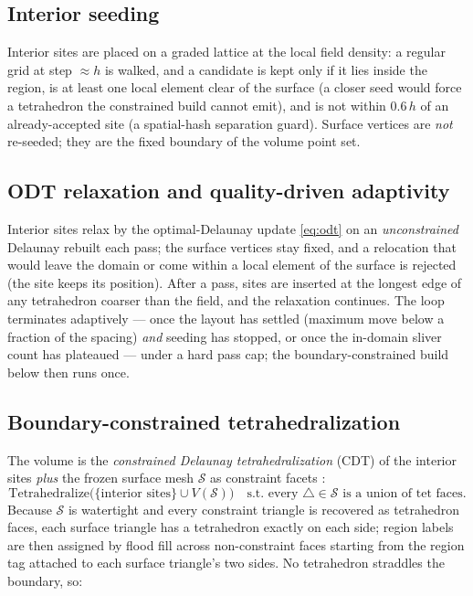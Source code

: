 \documentclass[11pt,a4paper]{article}
\numberwithin{equation}{section}
\begin{document}
\subsection{Interior seeding}
Interior sites are placed on a graded lattice at the local field density: a
regular grid at step $\approx h$ is walked, and a candidate is kept only if it
lies inside the region, is at least one local element clear of the surface (a
closer seed would force a tetrahedron the constrained build cannot emit), and is
not within $0.6\,h$ of an already-accepted site (a spatial-hash separation
guard). Surface vertices are \emph{not} re-seeded; they are the fixed boundary of
the volume point set.

\subsection{ODT relaxation and quality-driven adaptivity}
Interior sites relax by the optimal-Delaunay update \eqref{eq:odt} on an
\emph{unconstrained} Delaunay rebuilt each pass; the surface vertices stay fixed,
and a relocation that would leave the domain or come within a local element of the
surface is rejected (the site keeps its position). After a pass, sites are
inserted at the longest edge of any tetrahedron coarser than the field, and the
relaxation continues. The loop terminates adaptively --- once the layout has
settled (maximum move below a fraction of the spacing) \emph{and} seeding has
stopped, or once the in-domain sliver count has plateaued --- under a hard pass
cap; the boundary-constrained build below then runs once.

\subsection{Boundary-constrained tetrahedralization}
The volume is the \emph{constrained
Delaunay tetrahedralization} (CDT) of the interior sites \emph{plus} the frozen
surface mesh $\mathcal{S}$ as constraint facets
\cite{Si2015,ShewchukCDT2002,ChengDeyShewchuk2012}:
\begin{equation}
\text{Tetrahedralize}\bigl(\{\text{interior sites}\}\cup V(\mathcal{S})\bigr)
\quad\text{s.t. every } \triangle\in\mathcal{S} \text{ is a union of tet faces.}
\end{equation}
Because $\mathcal{S}$ is watertight and every constraint triangle is recovered
as tetrahedron faces, each surface triangle has a tetrahedron exactly on each
side; region labels are then assigned by flood fill across non-constraint faces
starting from the region tag attached to each surface triangle's two sides.
No tetrahedron straddles the boundary, so:
\end{document}
